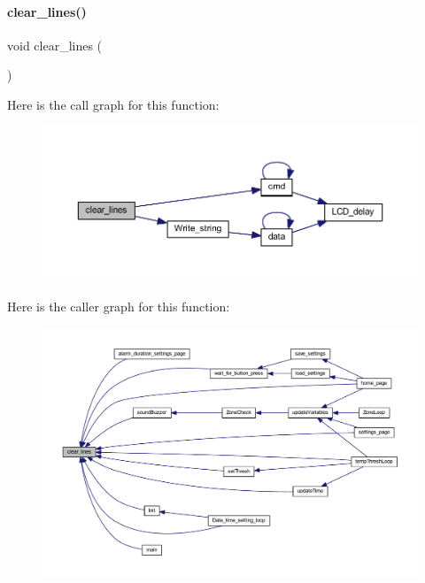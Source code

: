 \mbox{\label{a00035_a8180985bda05d2858c1cd892c9619a42}} 
\paragraph{clear\+\_\+lines()}
{\footnotesize\ttfamily void clear\+\_\+lines (\begin{DoxyParamCaption}{ }\end{DoxyParamCaption})}

Here is the call graph for this function\+:
\nopagebreak
\begin{figure}[H]
\begin{center}
\leavevmode
\includegraphics[width=350pt]{a00035_a8180985bda05d2858c1cd892c9619a42_cgraph}
\end{center}
\end{figure}
Here is the caller graph for this function\+:
\nopagebreak
\begin{figure}[H]
\begin{center}
\leavevmode
\includegraphics[width=350pt]{a00035_a8180985bda05d2858c1cd892c9619a42_icgraph}
\end{center}
\end{figure}
\mbox{\label{a00035_ac1f52f9c871ece7cb377c4fea1c6c79d}} 
